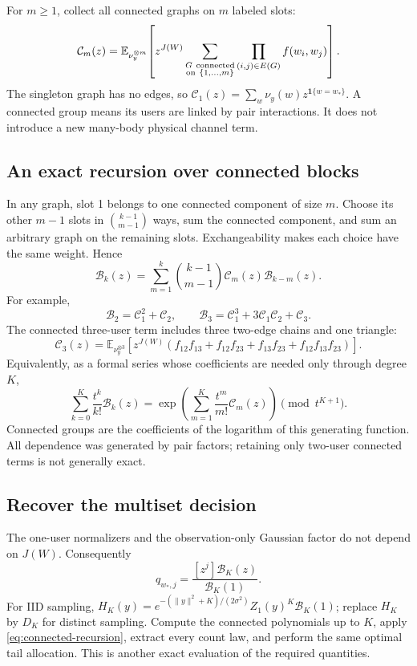 \documentclass[10pt,a4paper]{article}
\newcommand{\E}{\mathbb E}
\newcommand{\ind}{\mathbf 1}
\begin{document}
For $m\geq1$, collect all connected graphs on $m$ labeled slots:
\begin{equation}
 \mathcal C_m(z)=
 \E_{\nu_y^{\otimes m}}\!\left[
 z^{J(W)}
 \sum_{\substack{G\ {\rm connected}\\{\rm on}\ \{1,\ldots,m\}}}
       \prod_{(i,j)\in E(G)}f(w_i,w_j)\right].
 \label{eq:connected-block}
\end{equation}
The singleton graph has no edges, so $\mathcal C_1(z)=\sum_w\nu_y(w)z^{\ind\{w=w_*\}}$.
A connected group means its users are linked by pair interactions. It does not introduce a new many-body
physical channel term.

\clearpage
\subsection{An exact recursion over connected blocks}
In any graph, slot 1 belongs to one connected component of size $m$.
Choose its other $m-1$ slots in $\binom{k-1}{m-1}$ ways, sum the connected component, and sum an arbitrary
graph on the remaining slots. Exchangeability makes each choice have the same weight. Hence
\begin{equation}
 \boxed{\mathcal B_k(z)=
 \sum_{m=1}^k\binom{k-1}{m-1}
                 \mathcal C_m(z)\mathcal B_{k-m}(z).}
 \label{eq:connected-recursion}
\end{equation}
For example,
\[
 \mathcal B_2=\mathcal C_1^2+\mathcal C_2,\qquad
 \mathcal B_3=\mathcal C_1^3+3\mathcal C_1\mathcal C_2+\mathcal C_3.
\]
The connected three-user term includes three two-edge chains and one triangle:
\[
 \mathcal C_3(z)=\E_{\nu_y^{\otimes3}}\!
 \left[z^{J(W)}
 \left(f_{12}f_{13}+f_{12}f_{23}+f_{13}f_{23}+f_{12}f_{13}f_{23}\right)\right].
\]
Equivalently, as a formal series whose coefficients are needed only through degree $K$,
\[
 \sum_{k=0}^K\frac{t^k}{k!}\mathcal B_k(z)
 =\exp\!\left(\sum_{m=1}^K\frac{t^m}{m!}\mathcal C_m(z)\right)\pmod{t^{K+1}}.
\]
Connected groups are the coefficients of the logarithm of this generating function.
All dependence was generated by pair factors; retaining only two-user connected terms is not generally exact.

\subsection{Recover the multiset decision}
The one-user normalizers and the observation-only Gaussian factor do not depend on $J(W)$.
Consequently
\begin{equation}
 \boxed{q_{w_*,j}=
 \frac{[z^j]\mathcal B_K(z)}{\mathcal B_K(1)}.}
 \label{eq:connected-query}
\end{equation}
For IID sampling,
$H_K(y)=e^{-(\|y\|^2+K)/(2\sigma^2)}Z_1(y)^K\mathcal B_K(1)$;
replace $H_K$ by $D_K$ for distinct sampling.
Compute the connected polynomials up to $K$, apply \eqref{eq:connected-recursion}, extract every count law,
and perform the same optimal tail allocation. This is another exact evaluation of the required quantities.
\end{document}

